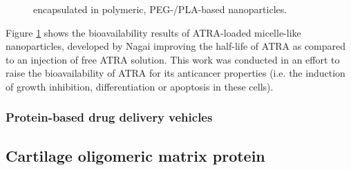 \begin{refsection}
\begin{figure}[h!]
{    encapsulated in polymeric, PEG-/PLA-based
    nanoparticles.\cite{Li2009}}\label{fig:PLA_ATRA_example} \end{figure}
Figure \ref{fig:PLA_ATRA_example} shows the bioavailability results of
ATRA-loaded micelle-like nanoparticles, developed by Nagai  improving the half-life of ATRA as compared to an injection of
free ATRA solution.\cite{Li2009} This work was conducted in an effort to raise
the bioavailability of ATRA for its anticancer properties (i.e. the induction of
growth inhibition, differentiation or apoptosis in these cells).\cite{Fang2002}

\subsubsection{Protein-based drug delivery vehicles}

\subsection{Cartilage oligomeric matrix protein}


\end{refsection}
